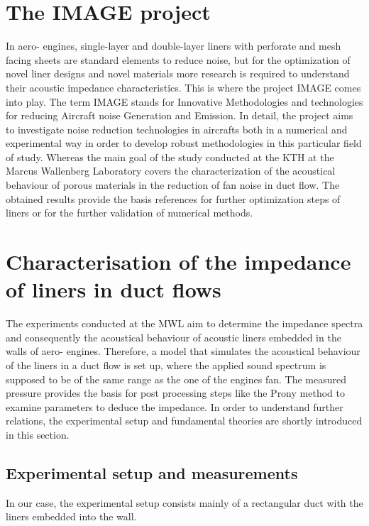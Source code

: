 \documentclass[11pt]{report} %
\begin{document}
\section{The IMAGE project} 
In aero- engines, single-layer and double-layer liners with perforate and mesh facing sheets are standard elements to reduce noise, but for the optimization of novel liner designs and novel materials more research is required to understand their acoustic impedance characteristics.
This is where the project IMAGE comes into play.
The term IMAGE stands for Innovative Methodologies and technologies for reducing Aircraft noise Generation and Emission.
In detail, the project aims to investigate noise reduction technologies in aircrafts both in a numerical and experimental way in order to develop robust methodologies in this particular field of study.  
Whereas the main goal of the study conducted at the KTH at the Marcus Wallenberg Laboratory covers the characterization of the acoustical behaviour of porous materials in the reduction of fan noise in duct flow. 
The obtained results provide the basis references for further optimization steps of liners or for the further validation of numerical methods. 

\section{Characterisation of the impedance of liners in duct flows}
The experiments conducted at the MWL aim to determine the impedance spectra and consequently the acoustical behaviour of acoustic liners embedded in the walls of aero- engines.
Therefore, a model that simulates the acoustical behaviour of the liners in a duct flow is set up, where the applied sound spectrum is supposed to be of the same range as the one of the engines fan.  
The measured pressure provides the basis for post processing steps like the Prony method to examine parameters to deduce the impedance.
In order to understand further relations, the experimental setup and fundamental theories are shortly introduced in this section. 


\subsection{Experimental setup and measurements}
In our case, the experimental setup consists mainly of a rectangular duct with the liners embedded into the wall.
\end{document}
